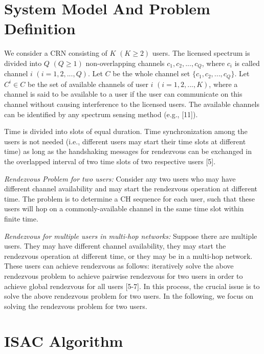 \documentclass[journal]{IEEEtran}
\begin{document}
 \section{System Model And Problem Definition}
 \par We consider a CRN consisting of $K$ $(K\geq 2)$ users. The licensed spectrum is divided into $Q$ $(Q\geq 1)$ non-overlapping channels $c_1,c_2,...,c_Q$, where $c_i$ is called channel $i$ $(i=1,2,...,Q)$. Let $C$ be the whole channel set $\{c_1,c_2,...,c_Q\}$. Let $C^i\in C$ be the set of available channels of user $i$ $(i=1,2,...,K)$, where a channel is said to be available to a user if the user can communicate on this channel without causing interference to the licensed users. The available channels can be identified by any spectrum sensing method (e.g., [11]).
 \par Time is divided into slots of equal duration. Time synchronization among the users is not needed (i.e., different users may start their time slots at different time) as long as the handshaking messages for rendezvous can be exchanged in the overlapped interval of two time slots of two respective users [5].
 \par \emph{Rendezvous Problem for two users:} Consider any two users who may have different channel availability and may start the rendezvous operation at different time. The problem is to determine a CH sequence for each user, such that these users will hop on a commonly-available channel in the same time slot within finite time.
  \par \emph{Rendezvous for multiple users in multi-hop networks:} Suppose there are multiple users. They may have different channel availability, they may start the rendezvous operation at different time, or they may be in a multi-hop network. These users can achieve rendezvous as follows: iteratively solve the above rendezvous problem to achieve pairwise rendezvous for two users in order to achieve global rendezvous for all users [5-7]. In this process, the crucial issue is to solve the above rendezvous problem for two users. In the following, we focus on solving the rendezvous problem for two users.
 \section{ISAC Algorithm}
\end{document}

